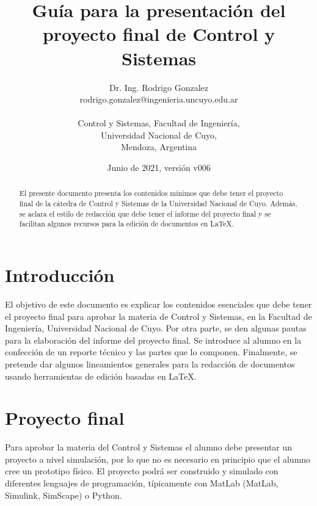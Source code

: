 \documentclass{article}
\title{Guía para la presentación del proyecto final de Control y Sistemas}
\author{Dr. Ing. Rodrigo Gonzalez \\ rodrigo.gonzalez@ingenieria.uncuyo.edu.ar \\ \\ Control y Sistemas, Facultad de Ingeniería, \\ Universidad Nacional de Cuyo, \\ Mendoza, Argentina}
\date{Junio de 2021, versión v006}
\begin{document}
\renewcommand{\tablename}{Tabla}

\maketitle

\begin{abstract}
    El presente documento presenta los contenidos mínimos que debe tener el proyecto final de la cátedra de Control y Sistemas de la Universidad Nacional de Cuyo. Además, se aclara el estilo de redacción que debe tener el informe del proyecto final y se facilitan algunos recursos para la edición de documentos en \LaTeX.  
\end{abstract}

\section{Introducción}
\label{sec:intro}


El objetivo de este documento es explicar los contenidos esenciales que debe tener el proyecto final para aprobar la materia de Control y Sistemas, en la Facultad de Ingeniería, Universidad Nacional de Cuyo. Por otra parte, se den algunas pautas para la elaboración del informe del proyecto final. Se introduce al alumno en la confección de un reporte técnico y las partes que lo componen. Finalmente, se pretende dar algunos lineamientos generales para la redacción de documentos usando herramientas de edición basadas en \LaTeX. 

\section{Proyecto final}
\label{sec:proyecto}

Para aprobar la materia del Control y Sistemas el alumno debe presentar un proyecto a nivel simulación, por lo que no es necesario en principio que el alumno cree un prototipo físico. El proyecto podrá ser construido y simulado con diferentes lenguajes de programación, típicamente con MatLab (MatLab, Simulink, SimScape) o Python.
\end{document}

